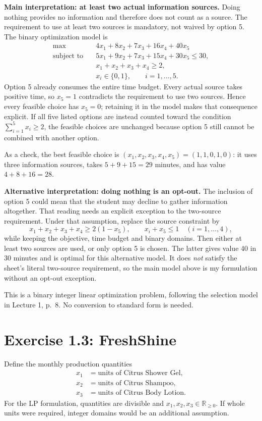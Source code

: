 \documentclass[11pt,a4paper]{article}
\begin{document}
\textbf{Main interpretation: at least two actual information sources.}
Doing nothing provides no information and therefore does not count as a source. The requirement to use at least two sources is mandatory, not waived by option 5. The binary optimization model is
\begin{align*}
\max\quad &4x_1+8x_2+7x_3+16x_4+40x_5\\
\text{subject to}\quad
&5x_1+9x_2+7x_3+15x_4+30x_5\leq30,\\
&x_1+x_2+x_3+x_4\geq2,\\
&x_i\in\{0,1\},\qquad i=1,\ldots,5.
\end{align*}
Option 5 already consumes the entire time budget. Every actual source takes positive time, so $x_5=1$ contradicts the requirement to use two sources. Hence every feasible choice has $x_5=0$; retaining it in the model makes that consequence explicit. If all five listed options are instead counted toward the condition $\sum_{i=1}^5x_i\geq2$, the feasible choices are unchanged because option 5 still cannot be combined with another option.

As a check, the best feasible choice is $(x_1,x_2,x_3,x_4,x_5)=(1,1,0,1,0)$: it uses three information sources, takes $5+9+15=29$ minutes, and has value $4+8+16=28$.

\textbf{Alternative interpretation: doing nothing is an opt-out.}
The inclusion of option 5 could mean that the student may decline to gather information altogether. That reading needs an explicit exception to the two-source requirement. Under that assumption, replace the source constraint by
\[
x_1+x_2+x_3+x_4\geq2(1-x_5),
\qquad x_i+x_5\leq1\quad(i=1,\ldots,4),
\]
while keeping the objective, time budget and binary domains. Then either at least two sources are used, or only option 5 is chosen. The latter gives value 40 in 30 minutes and is optimal for this alternative model. It does \emph{not} satisfy the sheet's literal two-source requirement, so the main model above is my formulation without an opt-out exception.

This is a binary integer linear optimization problem, following the selection model in Lecture 1, p.~8. No conversion to standard form is needed.
\newpage
\section*{Exercise 1.3: FreshShine}
Define the monthly production quantities
\begin{align*}
x_1&=\text{units of Citrus Shower Gel},\\
x_2&=\text{units of Citrus Shampoo},\\
x_3&=\text{units of Citrus Body Lotion}.
\end{align*}
For the LP formulation, quantities are divisible and $x_1,x_2,x_3\in\mathbb R_{\geq0}$. If whole units were required, integer domains would be an additional assumption.
\end{document}
